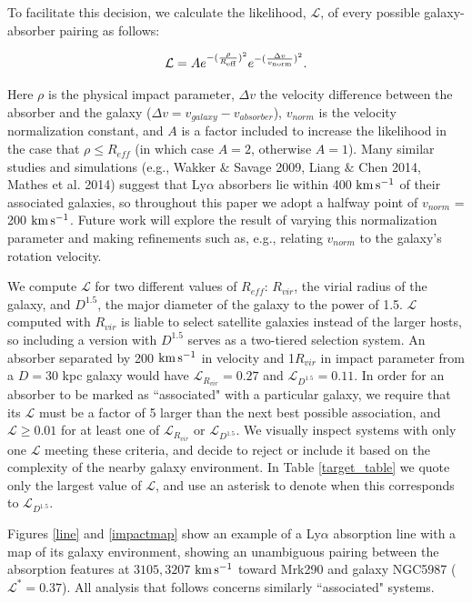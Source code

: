 \documentclass[twocolumn,tighten]{aastex6}
\begin{document}
To facilitate this decision, we calculate the likelihood, $\mathcal{L}$, of every possible galaxy-absorber pairing as follows:

\begin{equation}
	\mathcal{L} = A e^{-(\frac{\rho}{R_{\rm eff}})^2} e^{-(\frac{\Delta v}{v_{\rm norm}})^2}.
\end{equation}

\noindent Here $\rho$ is the physical impact parameter, $\Delta v$ the velocity difference between the absorber and the galaxy ($\Delta v = v_{galaxy} - v_{absorber}$), $v_{norm}$ is the velocity normalization constant, and $A$ is a factor included to increase the likelihood in the case that $\rho \leq R_{eff}$ (in which case $A = 2$, otherwise $A = 1$). Many similar studies and simulations (e.g., Wakker $\&$ Savage 2009, Liang $\&$ Chen 2014, Mathes et al. 2014) suggest that Ly$\alpha$ absorbers lie within 400 $\rm km\, s^{-1}$ of their associated galaxies, so throughout this paper we adopt a halfway point of $v_{norm}$ = 200 $\rm km\, s^{-1}$. Future work will explore the result of varying this normalization parameter and making refinements such as, e.g., relating $v_{norm}$ to the galaxy's rotation velocity.

We compute $\mathcal{L}$ for two different values of $R_{eff}$: $R_{vir}$, the virial radius of the galaxy, and $D^{1.5}$, the major diameter of the galaxy to the power of 1.5. $\mathcal{L}$ computed with $R_{vir}$ is liable to select satellite galaxies instead of the larger hosts, so including a version with $D^{1.5}$ serves as a two-tiered selection system. An absorber separated by 200 $\rm km\, s^{-1}$ in velocity and 1$R_{vir}$ in impact parameter from a $D=30$ kpc galaxy would have $\mathcal{L}_{R_{vir}} = 0.27$ and $\mathcal{L}_{D^{1.5}} = 0.11$. In order for an absorber to be marked as ``associated" with a particular galaxy, we require that its $\mathcal{L}$ must be a factor of 5 larger than the next best possible association, and $\mathcal{L} \ge 0.01$ for at least one of $\mathcal{L}_{R_{vir}}$ or $\mathcal{L}_{D^{1.5}}$. We visually inspect systems with only one $\mathcal{L}$ meeting these criteria, and decide to reject or include it based on the complexity of the nearby galaxy environment. In Table \ref{target_table} we quote only the largest value of $\mathcal{L}$, and use an asterisk to denote when this corresponds to $\mathcal{L}_{D^{1.5}}$.

Figures \ref{line} and \ref{impactmap} show an example of a Ly$\alpha$ absorption line with a map of its galaxy environment, showing an unambiguous pairing between the absorption features at $3105, 3207$ $\rm km\, s^{-1}$ toward Mrk290 and galaxy NGC5987 ($\mathcal{L}^* = 0.37$). All analysis that follows concerns similarly ``associated" systems.
\end{document}
